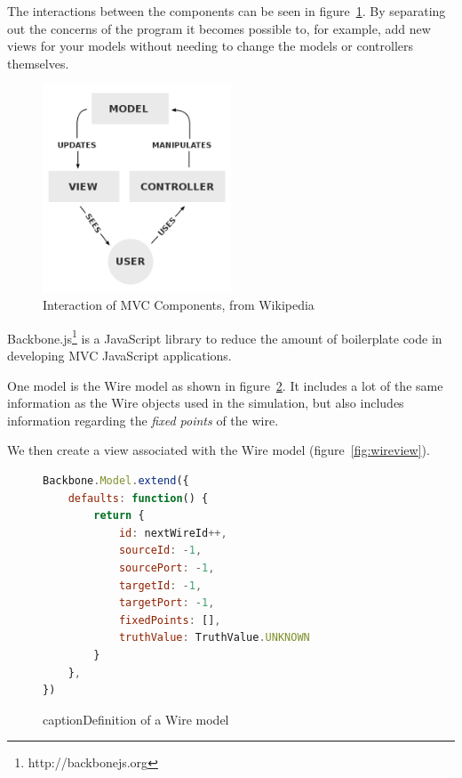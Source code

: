 The interactions between the components can be seen in figure~\ref{fig:mvc}. By separating out the concerns of the program it becomes possible to, for example, add new views for your models without needing to change the models or controllers themselves.

\begin{figure}[H]
	\centering
	\includegraphics[width=0.5\textwidth]{mvc.png}
	\caption{Interaction of MVC Components, from Wikipedia}
	\label{fig:mvc}
\end{figure}

Backbone.js\footnote{http://backbonejs.org} is a JavaScript library to reduce the amount of boilerplate code in developing MVC JavaScript applications.

One model is the Wire model as shown in figure~\ref{fig:wiremodel}. It includes a lot of the same information as the Wire objects used in the simulation, but also includes information regarding the \textit{fixed points} of the wire.

We then create a view associated with the Wire model (figure~\ref{fig:wireview}). 

\begin{figure}
\begin{lstlisting}[language=JavaScript]
Backbone.Model.extend({
	defaults: function() {
    	return {
        	id: nextWireId++,
        	sourceId: -1,
        	sourcePort: -1,
       	 	targetId: -1,
        	targetPort: -1,
        	fixedPoints: [],
        	truthValue: TruthValue.UNKNOWN
    	}
	},
})
\end{lstlisting}
caption{Definition of a Wire model}
\label{fig:wiremodel}
\end{figure}

